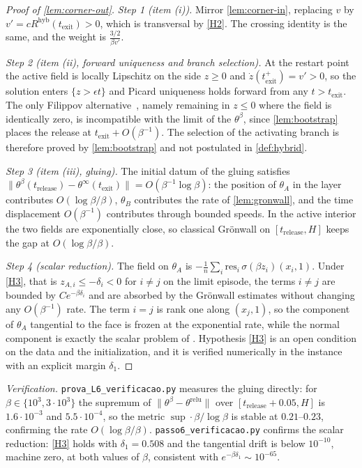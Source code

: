 \documentclass[11pt]{article}
\theoremstyle{definition}
\theoremstyle{remark}
\newcommand{\texit}{t_{\mathrm{exit}}}
\newcommand{\trel}{t_{\mathrm{release}}}
\newcommand{\hyb}{\mathrm{hyb}}
\begin{document}
\begin{proof}[Proof of \cref{lem:corner-out}]
\emph{Step 1 (item (i)).} Mirror \cref{lem:corner-in}, replacing $v$ by
$v'=cR^{\hyb}(\texit)>0$, which is transversal by \eqref{H2}. The crossing
identity is the same, and the weight is $\tfrac{3/2}{\beta v'}$.

\emph{Step 2 (item (ii), forward uniqueness and branch selection).} At the
restart point the active field is locally Lipschitz on the side $z\ge0$ and
$\dot z(\texit^+)=v'>0$, so the solution enters $\{z>\epsilon t\}$ and Picard
uniqueness holds forward from any $t>\texit$. The only Filippov
alternative~\cite{Fil88}, namely remaining in $z\le0$ where the field is
identically zero, is incompatible with the limit of the $\theta^\beta$, since
\cref{lem:bootstrap} places the release at $\texit+O(\beta^{-1})$. The selection
of the activating branch is therefore proved by \cref{lem:bootstrap} and not
postulated in \cref{def:hybrid}.

\emph{Step 3 (item (iii), gluing).} The initial datum of the gluing satisfies
$\|\theta^\beta(\trel)-\theta^\infty(\texit)\|=O(\beta^{-1}\log\beta)$: the
position of $\theta_A$ in the layer contributes $O(\log\beta/\beta)$, $\theta_B$
contributes the rate of \cref{lem:gronwall}, and the time displacement
$O(\beta^{-1})$ contributes through bounded speeds. In the active interior the
two fields are exponentially close, so classical Gr\"onwall on $[\trel,H]$ keeps
the gap at $O(\log\beta/\beta)$.

\emph{Step 4 (scalar reduction).} The field on $\theta_A$ is
$-\tfrac1n\sum_i\mathrm{res}_i\,\sigma(\beta z_i)(x_i,1)$. Under \eqref{H3}, that
is $z_{A,i}\le-\delta_i<0$ for $i\ne j$ on the limit episode, the terms $i\ne j$
are bounded by $Ce^{-\beta\delta_i}$ and are absorbed by the Gr\"onwall estimates
without changing any $O(\beta^{-1})$ rate. The term $i=j$ is rank one along
$(x_j,1)$, so the component of $\theta_A$ tangential to the face is frozen at the
exponential rate, while the normal component is exactly the scalar problem of
. Hypothesis \eqref{H3} is an open condition
on the data and the initialization, and it is verified numerically in the
instance with an explicit margin $\delta_1$.
\end{proof}

\noindent\emph{Verification.} \texttt{prova\_L6\_verificacao.py} measures the
gluing directly: for $\beta\in\{10^3,3\cdot10^3\}$ the supremum of
$\|\theta^\beta-\theta^{\mathrm{relu}}\|$ over $[\trel+0.05,H]$ is
$1.6\cdot10^{-3}$ and $5.5\cdot10^{-4}$, so the metric $\sup\cdot\beta/\log\beta$
is stable at $0.21$--$0.23$, confirming the rate $O(\log\beta/\beta)$.
\texttt{passo6\_verificacao.py} confirms the scalar reduction: \eqref{H3} holds
with $\delta_1=0.508$ and the tangential drift is below $10^{-10}$, machine zero,
at both values of $\beta$, consistent with $e^{-\beta\delta_1}\sim10^{-65}$.
\end{document}
